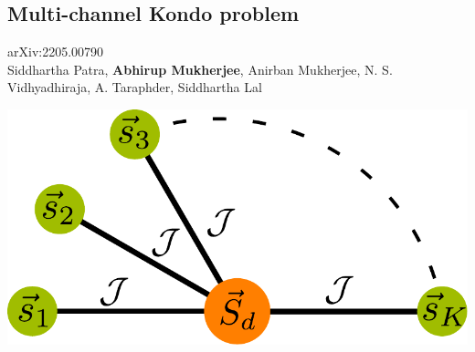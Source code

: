 \documentclass[10pt,aspectratio=169]{beamer}
\begin{document}
\begin{frame}{}
\section{Multi-channel Kondo problem}
\begin{minipage}{0.55\textwidth}
\small{arXiv:2205.00790\\[10pt]
Siddhartha Patra, {\bf Abhirup Mukherjee}, Anirban Mukherjee, N. S. Vidhyadhiraja, A. Taraphder, Siddhartha Lal}
\end{minipage}
\hspace*{\fill}
\begin{minipage}{0.4\textwidth}
	\includegraphics[width=\textwidth]{stargraph.pdf}
\end{minipage}
\end{frame}
\end{document}

